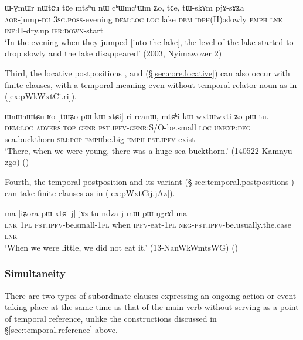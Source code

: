  \begin{exe}
\ex \label{ex:pWnWmdarndZi.WGmWr}
 ɯ-ɣmɯr nɯtɕu tɕe  mtsʰu nɯ cʰɯmcʰɯm ʑo, tɕe, tɯ-skɤm pjɤ-sɤʑa \\
\textsc{aor}-jump-\textsc{du} \textsc{3sg}.\textsc{poss}-evening \textsc{dem}:\textsc{loc} \textsc{loc} lake \textsc{dem} \textsc{idph}(II):slowly \textsc{emph} \textsc{lnk} \textsc{inf}:II-dry.up \textsc{ifr}:\textsc{down}-start \\
\glt `In the evening when they jumped [into the lake], the level of the lake started to drop slowly and the lake disappeared' (2003, Nyimawozer 2)
\end{exe}

Third, the locative postpositions ,  and  (§\ref{sec:core.locative}) can also occur with finite clauses, with a temporal meaning even without temporal relator noun as in (\ref{ex:pWkWxtCi.ri}).

 \begin{exe}
\ex \label{ex:pWkWxtCi.ri}
\gll  ɯnɯnɯtɕu ʁo [tɯʑo pɯ-kɯ-xtɕi] ri rcanɯ, mtɕʰi kɯ-wxtɯ\redp{}wxti ʑo pɯ-tu. \\
\textsc{dem}:\textsc{loc} \textsc{advers}:\textsc{top} \textsc{genr} \textsc{pst}.\textsc{ipfv}-\textsc{genr}:S/O-be.small \textsc{loc} \textsc{unexp}:\textsc{deg} sea.buckthorn \textsc{sbj}:\textsc{pcp}-\textsc{emph}\redp{}be.big \textsc{emph} \textsc{pst}.\textsc{ipfv}-exist \\
\glt `There, when we were young, there was a huge sea buckthorn.' (140522 Kamnyu zgo)
()
 \end{exe}
 
Fourth, the temporal postposition    and its variant  (§\ref{sec:temporal.postpositions}) can take finite clauses as in (\ref{ex:pWxtCij.jAz}).
    
 \begin{exe}
\ex \label{ex:pWxtCij.jAz}
\gll ma [iʑora pɯ-xtɕi-j] jɤz  tu-ndza-j mɯ-pɯ-ŋgrɤl ma \\
\textsc{lnk} \textsc{1pl} \textsc{pst}.\textsc{ipfv}-be.small-\textsc{1pl} when \textsc{ipfv}-eat-\textsc{1pl} \textsc{neg}-\textsc{pst}.\textsc{ipfv}-be.usually.the.case \textsc{lnk} \\
\glt `When we were little, we did not eat it.' (13-NanWkWmtsWG)
()
 \end{exe}

 
\subsubsection{Simultaneity} \label{sec:simultaneity}
 There are two types of subordinate clauses expressing an ongoing action or event taking place at the same time as that of the main verb without serving as a point of temporal reference, unlike the constructions discussed in §\ref{sec:temporal.reference} above.

